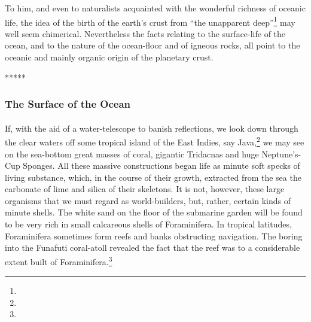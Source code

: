 \documentclass[a4paper, 12pt, oneside]{article}
\begin{document}
To him, and even to naturalists acquainted with the wonderful richness of oceanic life, the idea of the birth of the earth's crust from ``the unapparent deep''\footnote{} may well seem chimerical. Nevertheless the facts relating to the surface-life of the ocean, and to the nature of the ocean-floor and of igneous rocks, all point to the oceanic and mainly organic origin of the planetary crust.

\centerline{*\hspace{15mm}*\hspace{15mm}*\hspace{15mm}*\hspace{15mm}*}
\bigskip

\subsubsection{The Surface of the Ocean}
\paragraph{}
If, with the aid of a water-telescope to banish reflections, we look down through the clear waters off some tropical island of the East Indies, say Java,\footnote{} we may see on the sea-bottom great masses of coral, gigantic Tridacnas and huge Neptune's-Cup Sponges. All these massive constructions began life as minute soft specks of living substance, which, in the course of their growth, extracted from the sea the carbonate of lime and silica of their skeletons. It is not, however, these large organisms that we must regard as world-builders, but, rather, certain kinds of minute shells. The white sand on the floor of the submarine garden will be found to be very rich in small calcareous shells of Foraminifera. In tropical latitudes, Foraminifera sometimes form reefs and banks obstructing navigation. The boring into the Funafuti coral-atoll revealed the fact that the reef was to a considerable extent built of Foraminifera.\footnote{}
\end{document}
